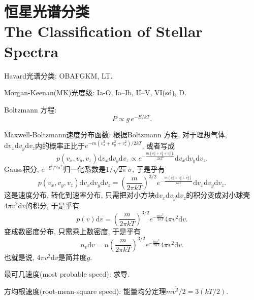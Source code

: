 \chapter{恒星光谱分类\\The Classification of Stellar Spectra}

Havard光谱分类: OBAFGKM, LT.

Morgan-Keenan(MK)光度级: Ia-O, Ia--Ib, II--V, VI(sd), D.

Boltzmann 方程:
\begin{equation*}
    P \propto g\,e^{-E/kT}.
\end{equation*}

Maxwell-Boltzmann速度分布函数: 根据Boltzmann 方程, 对于理想气体, $\mathrm{d}v_x\mathrm{d}v_y\mathrm{d}v_z$内的概率正比于$e^{-m(v_x^2+v_y^2+v_z^2)/2kT}$, 或者写成
\begin{equation*}
    p(v_x,v_y,v_z) \mathrm{d}v_x\mathrm{d}v_y\mathrm{d}v_z \propto e^{-\frac{m(v_x^2+v_y^2+v_z^2)}{2kT}} \mathrm{d}v_x\mathrm{d}v_y\mathrm{d}v_z.
\end{equation*}
Gauss积分, $e^{-\xi^2/2\sigma^2}$归一化系数是$1/\sqrt{2\pi}\sigma$, 于是乎有
\begin{equation*}
    p(v_x,v_y,v_z) \mathrm{d}v_x\mathrm{d}v_y\mathrm{d}v_z = \left(\frac{m}{2\pi kT}\right)^{3/2} e^{-\frac{m(v_x^2+v_y^2+v_z^2)}{2kT}} \mathrm{d}v_x\mathrm{d}v_y\mathrm{d}v_z.
\end{equation*}
这是速度分布, 转化到速率分布, 只需把对小方块$\mathrm{d}v_x\mathrm{d}v_y\mathrm{d}v_z$的积分变成对小球壳$4\pi v^2\mathrm{d}v$的积分, 于是乎有
\begin{equation*}
    p(v) \mathrm{d}v = \left(\frac{m}{2\pi kT}\right)^{3/2} e^{-\frac{mv^2}{2kT}} 4\pi v^2\mathrm{d}v.
\end{equation*}
变成数密度分布, 只需乘上数密度, 于是乎有
\begin{equation*}
    n_v \mathrm{d}v = n \left(\frac{m}{2\pi kT}\right)^{3/2} e^{-\frac{mv^2}{2kT}} 4\pi v^2\mathrm{d}v.
\end{equation*}
也就是说, $4\pi v^2\mathrm{d}v$是简并度$g$.

最可几速度(most probable speed): 求导.

方均根速度(root-mean-square speed): 能量均分定理$m\overline{v^2} /2=3(kT/2)$. 

